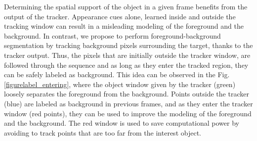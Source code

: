\label{sec:segm}
Determining the spatial support of the object in a given frame benefits from the output of the tracker. Appearance cues alone, learned inside and outside the tracking window can result in a misleading modeling of the foreground and the background. In contrast, we propose to perform foreground-background segmentation by tracking background pixels surrounding the target, thanks to the tracker output. Thus, the pixels that are initially outside the tracker window, 
are followed through the sequence and as long as they enter the tracked region, they can be safely labeled as background. This idea can be observed in the Fig.  \ref{figurelabel_entering}, 
where the object window given by the tracker (green) loosely separates the foreground from the background. Points outside the tracker (blue) are labeled as background in previous frames, and as they enter the tracker window (red points), they can be used to improve the modeling  of the foreground and the background. The red window is used to save computational power by avoiding to track points that are too far from the interest object.

